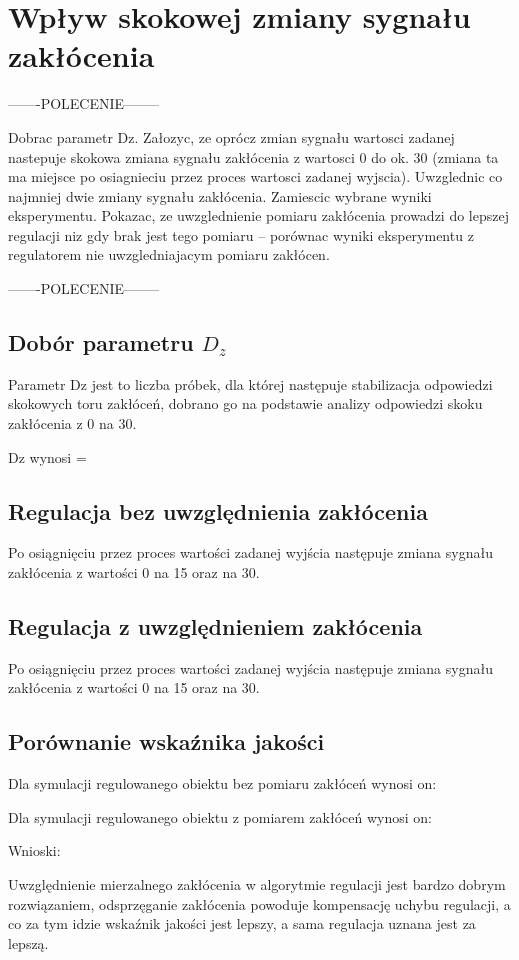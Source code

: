 \section{Wpływ skokowej zmiany sygnału zakłócenia}
\label{lab:zad5}

-------POLECENIE--------

Dobrac parametr Dz. Załozyc, ze oprócz zmian sygnału wartosci zadanej nastepuje
skokowa zmiana sygnału zakłócenia z wartosci 0 do ok. 30 (zmiana ta ma miejsce
po osiagnieciu przez proces wartosci zadanej wyjscia). Uwzglednic co najmniej
dwie zmiany sygnału zakłócenia. Zamiescic wybrane wyniki eksperymentu. Pokazac,
ze uwzglednienie pomiaru zakłócenia prowadzi do lepszej regulacji niz gdy brak jest
tego pomiaru – porównac wyniki eksperymentu z regulatorem nie uwzgledniajacym
pomiaru zakłócen.

-------POLECENIE--------


\subsection{Dobór parametru $D_z$}
\label{lab:zad4:Dz}

Parametr Dz jest to liczba próbek, dla której następuje stabilizacja odpowiedzi
skokowych toru zakłóceń, 
dobrano go na podstawie analizy odpowiedzi skoku zakłócenia z 0 na 30.

Dz wynosi =

\subsection{Regulacja bez uwzględnienia zakłócenia}
\label{lab:zad4:regulacjaBezUwzgZ}

Po osiągnięciu przez proces wartości zadanej wyjścia następuje zmiana sygnału
zakłócenia z wartości 0 na 15 oraz na 30.

\subsection{Regulacja z uwzględnieniem zakłócenia}
\label{lab:zad4:regulacjaUwzgZ}

Po osiągnięciu przez proces wartości zadanej wyjścia następuje zmiana sygnału
zakłócenia z wartości 0 na 15 oraz na 30.

\subsection{Porównanie wskaźnika jakości}
\label{lab:zad4:porownanieWskaznika}

Dla symulacji regulowanego obiektu bez pomiaru zakłóceń wynosi on:

Dla symulacji regulowanego obiektu z pomiarem zakłóceń wynosi on:

Wnioski: 

Uwzględnienie mierzalnego zakłócenia w algorytmie regulacji jest bardzo
dobrym rozwiązaniem, 
odsprzęganie zakłócenia powoduje kompensację uchybu regulacji, 
a co za tym idzie wskaźnik jakości jest lepszy, 
a sama regulacja uznana jest za lepszą.
